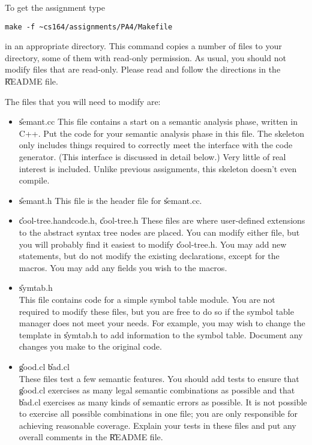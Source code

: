 To get the assignment type
\begin{verbatim}
make -f ~cs164/assignments/PA4/Makefile
\end{verbatim}
in an appropriate directory.  This command copies a number
of files to your directory, some of them with read-only permission.
As usual, you should not modify files that are read-only.
Please read and follow the directions in the \U{README} file.

The files that you will need to modify are:
\begin{itemize}

\item \U{semant.cc}
This file contains a start on a semantic analysis phase, written in C++.
Put the code for your semantic analysis phase in this
file.  The skeleton only includes things required to
correctly meet the interface with the code generator.  (This interface
is discussed in detail below.)  Very little of real interest is
included.  Unlike previous assignments, this skeleton doesn't even compile.

\item \U{semant.h}
This file is the header file for \U{semant.cc}.

\item \U{cool-tree.handcode.h}, \U{cool-tree.h}
These files are where user-defined extensions to the abstract syntax
tree nodes are placed.  You can modify either file, but you will probably
find it easiest to modify \U{cool-tree.h}.  
You may add new  statements,
but do not modify the existing declarations, except for the 
macros.  You may add any fields you wish to the  macros.

\item \U{symtab.h} \\
This file contains code for a simple symbol table module.
You are not required to modify these files, but you are free to do so if the symbol
table manager does not meet your needs.  
For example, you may wish to change the  template in
\U{symtab.h} to add information to the symbol table.
Document any changes you make to the original code.

\item \U{good.cl} \U{bad.cl} \\
These files test a few semantic features.
You should add tests to ensure that \U{good.cl} exercises as many legal
semantic combinations as possible and that \U{bad.cl} exercises as many
kinds of semantic errors as possible.  It is not possible to exercise
all possible combinations in one file; you are only responsible for
achieving reasonable coverage.  Explain your tests in these files and put
any overall comments in the \U{README} file.


\end{itemize}
